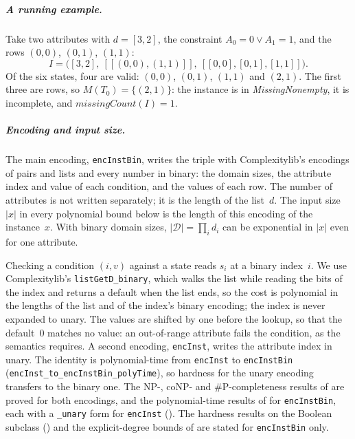 \documentclass[pdflatex,sn-mathphys-num]{sn-jnl}
\theoremstyle{thmstyleone}
\theoremstyle{thmstylethree}
\begin{document}
\subparagraph*{A running example.}
Take two attributes with $d = [3, 2]$, the constraint $A_0 = 0 \lor A_1 = 1$, and the rows
$(0,0)$, $(0,1)$, $(1,1)$:
\[
I = \bigl([3, 2],\ [[(0,0), (1,1)]],\ [[0,0], [0,1], [1,1]]\bigr).
\]
Of the six states, four are valid: $(0,0)$, $(0,1)$, $(1,1)$ and $(2,1)$. The first three are
rows, so $M(T_0) = \{(2,1)\}$: the instance is in \textit{MissingNonempty}, it is incomplete,
and $\textit{missingCount}(I) = 1$.

\subparagraph*{Encoding and input size.}
The main encoding, \lstinline{encInstBin}, writes the triple with Complexitylib's encodings of
pairs and lists and every number in binary: the domain sizes, the attribute index and value of
each condition, and the values of each row. The number of attributes is not written separately;
it is the length of the list~$d$. The input size $|x|$ in every polynomial bound below is the
length of this encoding of the instance~$x$. With binary domain sizes,
$|\mathcal{D}| = \prod_i d_i$ can be exponential in $|x|$ even for one attribute.

Checking a condition $(i, v)$ against a state reads $s_i$ at a binary index~$i$. We use
Complexitylib's \lstinline{listGetD_binary}, which walks the list while reading the bits of the
index and returns a default when the list ends, so the cost is polynomial in the lengths of the
list and of the index's binary encoding; the index is never expanded to unary. The values are
shifted by one before the lookup, so that the default~$0$ matches no value: an out-of-range
attribute fails the condition, as the semantics requires. A second encoding,
\lstinline{encInst}, writes the attribute index in unary. The identity is polynomial-time from
\lstinline{encInst} to \lstinline{encInstBin} (\lstinline{encInst_to_encInstBin_polyTime}), so
hardness for the unary encoding transfers to the binary one. The NP-, coNP- and
\#P-completeness results of  are proved for both
encodings, and the polynomial-time results of  for \lstinline{encInstBin},
each with a \lstinline{_unary} form for \lstinline{encInst} (). The
hardness results on the Boolean subclass () and the explicit-degree bounds of
 are stated for \lstinline{encInstBin} only.
\end{document}
